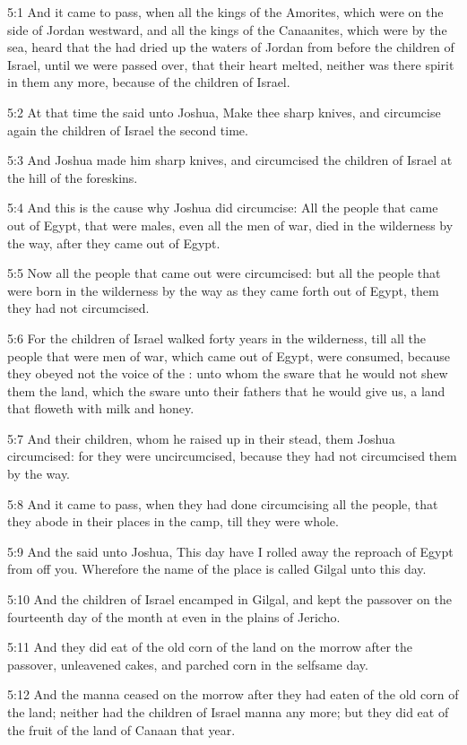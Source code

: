 5:1 And it came to pass, when all the kings of the Amorites, which were on the side of Jordan westward, and all the kings of the Canaanites, which were by the sea, heard that the \LORD had dried up the waters of Jordan from before the children of Israel, until we were passed over, that their heart melted, neither was there spirit in them any more, because of the children of Israel.

5:2 At that time the \LORD said unto Joshua, Make thee sharp knives, and circumcise again the children of Israel the second time.

5:3 And Joshua made him sharp knives, and circumcised the children of Israel at the hill of the foreskins.

5:4 And this is the cause why Joshua did circumcise: All the people that came out of Egypt, that were males, even all the men of war, died in the wilderness by the way, after they came out of Egypt.

5:5 Now all the people that came out were circumcised: but all the people that were born in the wilderness by the way as they came forth out of Egypt, them they had not circumcised.

5:6 For the children of Israel walked forty years in the wilderness, till all the people that were men of war, which came out of Egypt, were consumed, because they obeyed not the voice of the \LORD: unto whom the \LORD sware that he would not shew them the land, which the \LORD sware unto their fathers that he would give us, a land that floweth with milk and honey.

5:7 And their children, whom he raised up in their stead, them Joshua circumcised: for they were uncircumcised, because they had not circumcised them by the way.

5:8 And it came to pass, when they had done circumcising all the people, that they abode in their places in the camp, till they were whole.

5:9 And the \LORD said unto Joshua, This day have I rolled away the reproach of Egypt from off you. Wherefore the name of the place is called Gilgal unto this day.

5:10 And the children of Israel encamped in Gilgal, and kept the passover on the fourteenth day of the month at even in the plains of Jericho.

5:11 And they did eat of the old corn of the land on the morrow after the passover, unleavened cakes, and parched corn in the selfsame day.

5:12 And the manna ceased on the morrow after they had eaten of the old corn of the land; neither had the children of Israel manna any more; but they did eat of the fruit of the land of Canaan that year.

